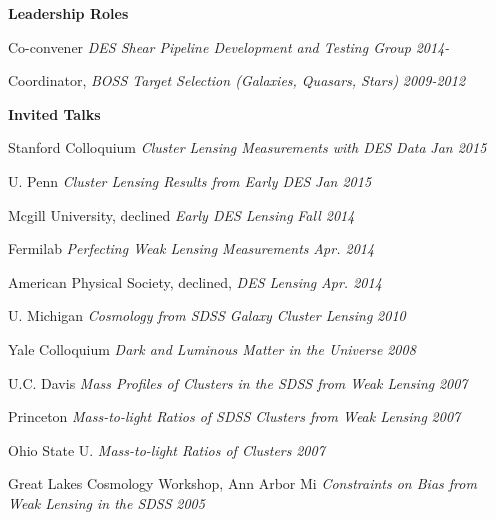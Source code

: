 \ssp
\ssp
\noindent
\parbox[l]{1.25in}{{\bf Leadership Roles}}
\parbox[t]{5.40in}{

Co-convener {\it DES Shear Pipeline Development and Testing Group} \hfill {\small \it 2014-} \newline

Coordinator, {\it BOSS Target Selection (Galaxies, Quasars, Stars) } \hfill {\small \it 2009-2012} \newline

}
\ssp
\ssp
\noindent
\parbox[l]{1.25in}{{\bf Invited Talks}}
\parbox[t]{5.40in}{

Stanford Colloquium {\it Cluster Lensing Measurements with DES Data} \hfill {\small \it Jan 2015} \newline

U. Penn  {\it Cluster Lensing Results from Early DES} \hfill {\small \it Jan 2015} \newline

Mcgill University, declined {\it Early DES Lensing} \hfill {\small \it Fall 2014} \newline

Fermilab {\it Perfecting Weak Lensing Measurements} \hfill {\small \it Apr. 2014} \newline

American Physical Society, declined, {\it DES Lensing} \hfill {\small \it Apr. 2014} \newline

U. Michigan {\it  Cosmology from SDSS Galaxy Cluster Lensing} \hfill {\small \it 2010} \newline

Yale Colloquium {\it Dark and Luminous Matter in the Universe}     \hfill {\small \it 2008} \newline

U.C. Davis {\it Mass Profiles of Clusters in the SDSS from Weak Lensing} \hfill {\small \it 2007} \newline

Princeton {\it Mass-to-light Ratios of SDSS Clusters from Weak Lensing} \hfill {\small \it 2007} \newline

Ohio State U. {\it Mass-to-light Ratios of Clusters} \hfill {\small \it 2007} \newline

Great Lakes Cosmology Workshop, Ann Arbor Mi {\it Constraints on Bias from Weak Lensing in the SDSS} \hfill {\small \it 2005} \newline

}
